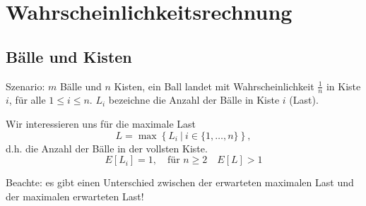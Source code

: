 \section{Wahrscheinlichkeitsrechnung}
\subsection{Bälle und Kisten}
Szenario: $m$ Bälle und $n$ Kisten, ein Ball landet mit Wahrscheinlichkeit
$\frac{1}{n}$ in Kiste $i$, für alle $1\leq i\leq n$. $L_i$ bezeichne die
Anzahl der Bälle in Kiste $i$ (Last).

Wir interessieren uns für die maximale Last
\[
  L = \max\left\{ L_i\ |\ i \in \{1,\dots,n\}\right\},
\]
d.h. die Anzahl der Bälle in der vollsten Kiste.
\[
  E[L_i] = 1, \quad \text{für } n \geq 2 \quad E[L] > 1
\]

Beachte: es gibt einen Unterschied zwischen der erwarteten maximalen Last und
der maximalen erwarteten Last!

